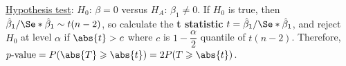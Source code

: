\underline{Hypothesis test}:
$ H_0 $: $ \beta=0 $ versus
$ H_A $: $ \beta_1\neq 0 $.
If $ H_0 $ is true, then $ \hat{\beta}_1/\Se*{\hat{\beta}_1} \sim t(n-2) $,
so calculate the \textbf{t statistic}
$ t=\hat{\beta}_1/\Se*{\hat{\beta}_1} $,
and reject $ H_0 $ at level $ \alpha $ if $ \abs{t}>c $
where $ c $ is $ 1-\dfrac{\alpha}{2} $ quantile of $ t(n-2) $.
Therefore,
$ p\text{-value}=P(\abs{T}\geqslant \abs{t})
  =2P(T\geqslant \abs{t}) $.
